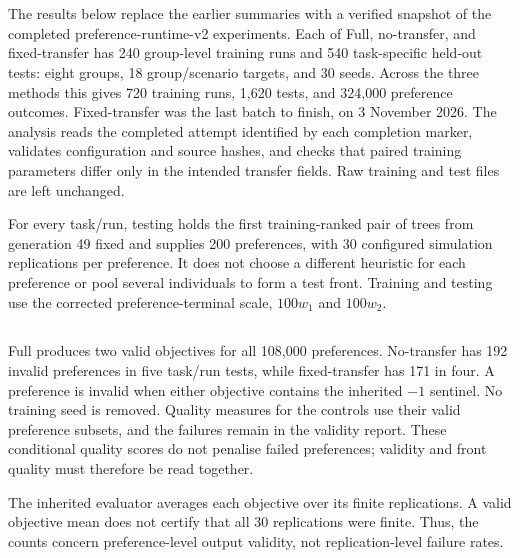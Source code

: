 \begingroup
\color{resultrevision}
\section{}
\label{sec:results}
The results below replace the earlier summaries with a verified snapshot of the completed preference-runtime-v2 experiments. Each of Full, no-transfer, and fixed-transfer has 240 group-level training runs and 540 task-specific held-out tests: eight groups, 18 group/scenario targets, and 30 seeds. Across the three methods this gives 720 training runs, 1,620 tests, and 324,000 preference outcomes. Fixed-transfer was the last batch to finish, on 3 November 2026. The analysis reads the completed attempt identified by each completion marker, validates configuration and source hashes, and checks that paired training parameters differ only in the intended transfer fields. Raw training and test files are left unchanged.

For every task/run, testing holds the first training-ranked pair of trees from generation 49 fixed and supplies 200 preferences, with 30 configured simulation replications per preference. It does not choose a different heuristic for each preference or pool several individuals to form a test front. Training and testing use the corrected preference-terminal scale, $100w_1$ and $100w_2$.

\subsection{}
Full produces two valid objectives for all 108,000 preferences. No-transfer has 192 invalid preferences in five task/run tests, while fixed-transfer has 171 in four. A preference is invalid when either objective contains the inherited $-1$ sentinel. No training seed is removed. Quality measures for the controls use their valid preference subsets, and the failures remain in the validity report. These conditional quality scores do not penalise failed preferences; validity and front quality must therefore be read together.

The inherited evaluator averages each objective over its finite replications. A valid objective mean does not certify that all 30 replications were finite. Thus, the counts concern preference-level output validity, not replication-level failure rates.

